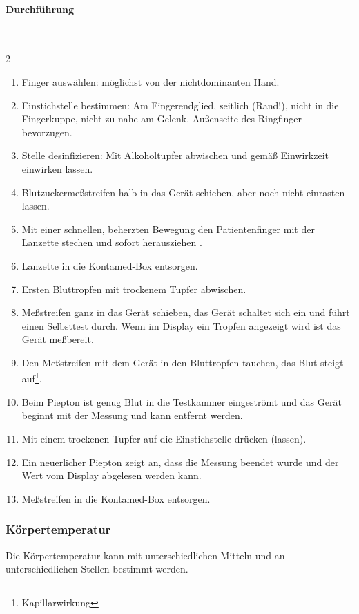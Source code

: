 \paragraph{Durchführung}~
\begin{multicols}{2}
\begin{enumerate}
  \item Finger auswählen: möglichst von der nichtdominanten
  Hand.
  \item Einstichstelle bestimmen: Am Fingerendglied,
  seitlich (Rand!), nicht in die Fingerkuppe, nicht zu nahe
  am Gelenk. Außenseite des Ringfinger bevorzugen.
  \item Stelle desinfizieren: Mit Alkoholtupfer abwischen
  und gemäß Einwirkzeit einwirken lassen.
  \item Blutzuckermeßstreifen halb in das Gerät schieben,
  aber noch nicht einrasten lassen.
  \item Mit einer schnellen, beherzten Bewegung den
  Patientenfinger mit der Lanzette stechen und sofort
  herausziehen .
  \item Lanzette in die Kontamed-Box entsorgen.
  \item Ersten Bluttropfen mit trockenem Tupfer abwischen.
  \item Meßstreifen ganz in das Gerät schieben, das Gerät
  schaltet sich ein und führt einen Selbsttest durch. Wenn
  im Display ein Tropfen angezeigt wird ist das Gerät
  meßbereit.
  \item Den Meßstreifen mit dem Gerät in den Bluttropfen
  tauchen, das Blut steigt auf\footnote{Kapillarwirkung}.
  \item Beim Piepton ist genug Blut in die Testkammer
  eingeströmt und das Gerät beginnt mit der Messung und kann
  entfernt werden. 
  \item Mit einem trockenen Tupfer auf die Einstichstelle
  drücken (lassen).
  \item Ein neuerlicher Piepton zeigt an, dass die Messung
  beendet wurde und der Wert vom Display abgelesen
  werden kann. 
  \item Meßstreifen in die Kontamed-Box entsorgen.
\end{enumerate}
\end{multicols}

\subsubsection{Körpertemperatur}

Die Körpertemperatur kann mit unterschiedlichen Mitteln und
an unterschiedlichen Stellen bestimmt werden. 

